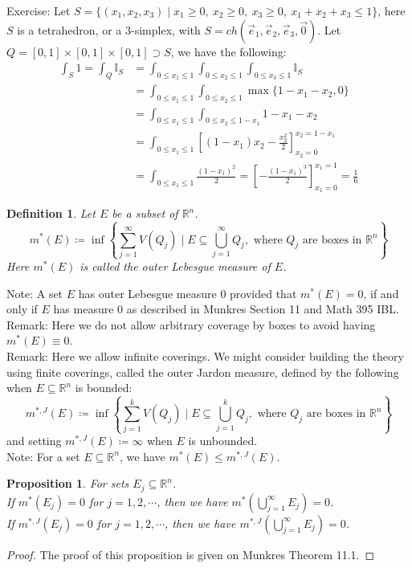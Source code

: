 \documentclass[15pt]{book}
\theoremstyle{break}
\theoremstyle{break}
\newtheorem{prop}[lem]{Proposition}
\newtheorem{defn}{Definition}[corL]
\newcommand{\R}{\mathbb{R}}
\newcommand{\note}{\color{red}Note: \color{black}}
\newcommand{\remark}{\color{blue}Remark: \color{black}}
\newcommand{\exercise}{\color{green}Exercise: \color{black}}
\begin{document}
\exercise Let $S = \{(x_1,x_2,x_3) \mid x_1 \geq 0,\ x_2\geq 0,\ x_3 \geq 0,\ x_1+x_2+x_3 \leq 1 \}$, here $S$ is a tetrahedron, or a $3$-simplex, with $S = ch( \vec{e}_1,\vec{e}_2,\vec{e}_3,\vec{0})$. Let $Q = [0,1]\times[0,1]\times[0,1]\supset S$, we have the following: 
\begin{align*}
\int_S 1 = \int_{Q} \mathbb{I}_S 
&= \int_{0\leq x_1\leq 1} \int_{0\leq x_2 \leq 1} \int_{0\leq x_3 \leq 1} \mathbb{I}_S 
\\&= \int_{0\leq x_1 \leq 1} \int_{0\leq x_2 \leq 1} \max\{ 1-x_1-x_2, 0\} 
\\&= \int_{0 \leq x_1 \leq 1} \int_{0 \leq x_2 \leq 1-x_1} 1-x_1-x_2
\\&= \int_{0\leq x_1 \leq 1} \left[(1-x_1) x_2 - \frac{x_2^2}{2}\right]^{x_2 = 1-x_1}_{x_2 = 0}
\\&= \int_{0\leq x_1 \leq 1} \frac{(1-x_1)^2}{2} = \left[-\frac{(1-x_1)^3}{2}\right]_{x_1 = 0}^{x_1=1} = \frac{1}{6}
\end{align*}


\newpage
\begin{defn}
Let $E$ be a subset of $\R^n$. $$m^*(E) \coloneqq  \inf\left\{\sum_{j=1}^\infty V(Q_j) \mid E \subseteq \bigcup_{j=1}^\infty Q_j, \text{ where } Q_j \text{ are boxes in }\R^n \right\} $$
Here $m^*(E)$ is called the outer Lebesgue measure of $E$.
\end{defn}

\note A set $E$ has outer Lebesgue measure $0$ provided that $m^*(E) = 0$, if and only if $E$ has measure $0$ as described in Munkres Section 11 and Math 395 IBL. \\

\remark Here we do not allow arbitrary coverage by boxes to avoid having $m^*(E) \equiv 0$.\\

\remark Here we allow infinite coverings. We might consider building the theory using finite coverings, called the outer Jardon measure, defined by the following when $E\subseteq \R^n$ is bounded:
$$m^{*,J}(E) \coloneqq  \inf\left\{\sum_{j=1}^k V(Q_j) \mid E \subseteq \bigcup_{j=1}^k Q_j, \text{ where } Q_j \text{ are boxes in }\R^n \right\} $$
and setting $m^{*,J}(E) \coloneqq \infty$ when $E$ is unbounded. \\


\note For a set $E\subseteq \R^n$, we have $m^*(E) \leq m^{*,J}(E)$.
\begin{prop}
For sets $E_j\subseteq \R^n$.\\ If $m^*(E_j) = 0$ for $j=1,2,\cdots$, then we have $m^*(\bigcup_{j=1}^\infty E_j) = 0$. \\If $m^{*,J}(E_j) = 0$ for $j=1,2,\cdots$, then we have $m^{*,J}(\bigcup_{j=1}^\infty E_j) = 0$.
\end{prop}
\begin{proof}
The proof of this proposition is given on Munkres Theorem 11.1.
\end{proof}
\end{document}
